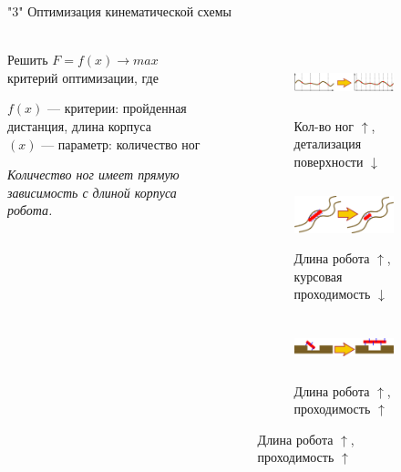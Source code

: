 \documentclass[aspectratio=169,xcolor=table,10pt]{beamer}
\begin{document}
\begin{frame}[t]{"3" Оптимизация кинематической схемы}
    \framesubtitle{}
    \begin{columns}[T,onlytextwidth]
        \begin{column}{0.49\textwidth}
            Решить $F=f(x) \rightarrow max$ критерий оптимизации, где

            $f(x)$ --- критерии: пройденная дистанция, длина корпуса\\
            $(x)$ --- параметр: количество ног

            \textit{Количество ног имеет прямую зависимость с длиной корпуса робота.}
        \end{column}
        \begin{column}{0.49\textwidth}
            \vspace{-0.5cm}
            \begin{figure}[H]
                \begin{subfigure}{0.99\textwidth}
                    \centering\includegraphics[height=1.8cm,width=1\textwidth,keepaspectratio]{f1.png}
                    \caption*{Кол-во ног $\uparrow$, детализация поверхности $\downarrow$}
                    \label{fig:f1.png}
                \end{subfigure}

                \begin{subfigure}{0.99\textwidth}
                    \centering\includegraphics[height=1.8cm,width=1\textwidth,keepaspectratio]{f2.png}
                    \caption*{Длина робота $\uparrow$, курсовая проходимость $\downarrow$}
                    \label{fig:f2.png}
                \end{subfigure}

                \begin{subfigure}{0.99\textwidth}
                    \centering\includegraphics[height=1.8cm,width=1\textwidth,keepaspectratio]{f3_new.png}
                    \caption*{Длина робота $\uparrow$, проходимость $\uparrow$}
                    \label{fig:f3.png}
                \end{subfigure}
            \end{figure}
        \end{column}
    \end{columns}
\end{frame}
\end{document}
